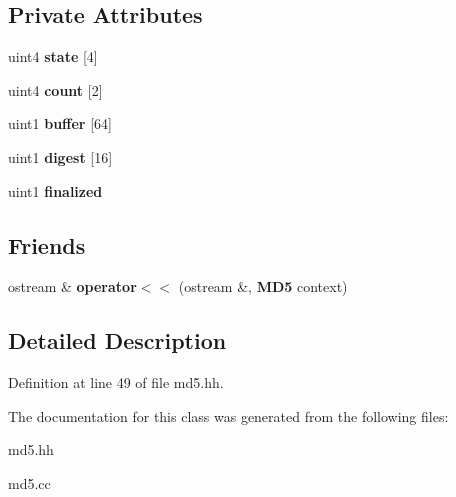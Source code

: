 \subsection*{Private Attributes}
\begin{DoxyCompactItemize}
\item 
uint4 {\bfseries state} [4]\label{classMD5_aae3f861952f5b129463f550170836db0}

\item 
uint4 {\bfseries count} [2]\label{classMD5_a52a9ff26a3de9e831b17c1740aa5388a}

\item 
uint1 {\bfseries buffer} [64]\label{classMD5_a2da5cb0336064b6f96de5b69fd4d219d}

\item 
uint1 {\bfseries digest} [16]\label{classMD5_a31058e1dca10bbf29818bb5177ff02ac}

\item 
uint1 {\bfseries finalized}\label{classMD5_a35a2d039cfb8e13a959201667911211d}

\end{DoxyCompactItemize}
\subsection*{Friends}
\begin{DoxyCompactItemize}
\item 
ostream \& {\bfseries operator$<$$<$} (ostream \&, {\bf MD5} context)\label{classMD5_a37bb1f259ab8bdfe589f3fc5f07a62d0}

\end{DoxyCompactItemize}


\subsection{Detailed Description}


Definition at line 49 of file md5.hh.

The documentation for this class was generated from the following files:\begin{DoxyCompactItemize}
\item 
md5.hh\item 
md5.cc\end{DoxyCompactItemize}
